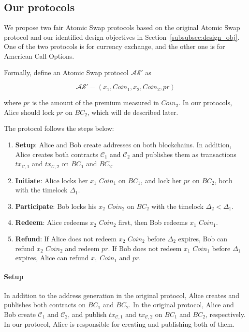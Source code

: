 \subsection{Our protocols}

We propose two fair Atomic Swap protocols based on the original Atomic Swap protocol and our identified design objectives in Section~\ref{subsubsec:design_obj}.
One of the two protocols is for currency exchange, and the other one is for American Call Options.

Formally, define an Atomic Swap protocol $\mathcal{AS}'$ as

$$\mathcal{AS}' = (x_1, Coin_1, x_2, Coin_2, pr)$$

where $pr$ is the amount of the premium measured in $Coin_2$.
In our protocols, Alice should lock $pr$ on $BC_2$, which will de described later.

The protocol follows the steps below:

\begin{enumerate}
    \item \textbf{Setup}: Alice and Bob create addresses on both blockchains.
    In addition, Alice creates both contracts $\mathcal{C}_1$ and $\mathcal{C}_2$ and publishes them as transactions $tx_{\mathcal{C}, 1}$ and $tx_{\mathcal{C}, 2}$ on $BC_1$ and $BC_2$. 
    \item \textbf{Initiate}: Alice locks her $x_1$ $Coin_1$ on $BC_1$, and lock her $pr$ on $BC_2$, both with the timelock $\Delta_1$.
    \item \textbf{Participate}: Bob locks his $x_2$ $Coin_2$ on $BC_2$ with the timelock $\Delta_2 < \Delta_1$.
    \item \textbf{Redeem}: Alice redeems $x_2$ $Coin_2$ first, then Bob redeems $x_1$ $Coin_1$.
    \item \textbf{Refund}: If Alice does not redeem $x_2$ $Coin_2$ before $\Delta_2$ expires, Bob can refund $x_2$ $Coin_2$ and redeem $pr$.
    If Bob does not redeem $x_1$ $Coin_1$ before $\Delta_1$ expires, Alice can refund $x_1$ $Coin_1$ and $pr$.
\end{enumerate}

\paragraph{Setup}
In addition to the address generation in the original protocol,
Alice creates and publishes both contracts on $BC_1$ and $BC_2$.
In the original protocol, Alice and Bob create $\mathcal{C}_1$ and $\mathcal{C}_2$, and publish $tx_{\mathcal{C}, 1}$ and $tx_{\mathcal{C}, 2}$ on $BC_1$ and $BC_2$, respectively.
In our protocol, Alice is responsible for creating and publishing both of them.

